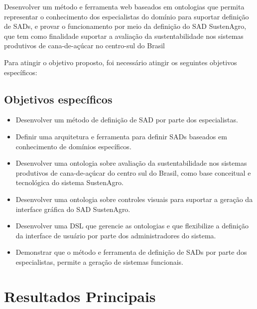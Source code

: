 Desenvolver um método e ferramenta web baseados em ontologias que
permita representar o conhecimento dos especialistas do domínio para
suportar definição de SADs, e provar o funcionamento por meio da definição
do SAD SustenAgro, que tem como finalidade suportar a avaliação da
sustentabilidade nos sistemas produtivos de cana-de-açúcar no centro-sul
do Brasil 

Para atingir o objetivo proposto, foi necessário atingir os seguintes
objetivos específicos: 

\subsection*{Objetivos específicos}
\begin{itemize}
\item Desenvolver um método de definição de SAD por parte dos especialistas.
\item Definir uma arquitetura e ferramenta para definir SADs baseados em
conhecimento de domínios específicos.
\item Desenvolver uma ontologia sobre avaliação da sustentabilidade nos
sistemas produtivos de cana-de-açúcar do centro sul do Brasil, como
base conceitual e tecnológica do sistema SustenAgro.
\item Desenvolver uma ontologia sobre controles visuais para suportar a
geração da interface gráfica do SAD SustenAgro.
\item Desenvolver uma DSL que gerencie as ontologias e que flexibilize a
definição da interface de usuário por parte dos administradores do
sistema.
\item Demonstrar que o método e ferramenta de definição de SADs por parte
dos especialistas, permite a geração de sistemas funcionais.
\end{itemize}

\section{Resultados Principais}

